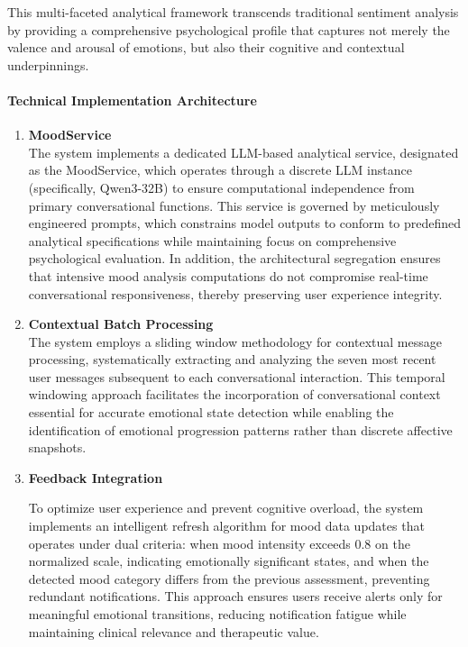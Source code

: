 This multi-faceted analytical framework transcends traditional sentiment analysis by providing a comprehensive psychological profile that captures not merely the valence and arousal of emotions, but also their cognitive and contextual underpinnings.

\paragraph{Technical Implementation Architecture}

\begin{enumerate}
\item \textbf{MoodService }\\
The system implements a dedicated LLM-based analytical service, designated as the MoodService, which operates through a discrete LLM instance (specifically, Qwen3-32B) to ensure computational independence from primary conversational functions. This service is governed by meticulously engineered prompts, which constrains model outputs to conform to predefined analytical specifications while maintaining focus on comprehensive psychological evaluation. In addition, the architectural segregation  ensures that intensive mood analysis computations do not compromise real-time conversational responsiveness, thereby preserving user experience integrity.

    \item \textbf{Contextual Batch Processing}\\
The system employs a sliding window methodology for contextual message processing, systematically extracting and analyzing the seven most recent user messages subsequent to each conversational interaction. This temporal windowing approach facilitates the incorporation of conversational context essential for accurate emotional state detection while enabling the identification of emotional progression patterns rather than discrete affective snapshots. 

\item \textbf{Feedback Integration}

To optimize user experience and prevent cognitive overload, the system implements an intelligent refresh algorithm for mood data updates that operates under dual criteria: when mood intensity exceeds 0.8 on the normalized scale, indicating emotionally significant states, and when the detected mood category differs from the previous assessment, preventing redundant notifications. This approach ensures users receive alerts only for meaningful emotional transitions, reducing notification fatigue while maintaining clinical relevance and therapeutic value.


\end{enumerate}
